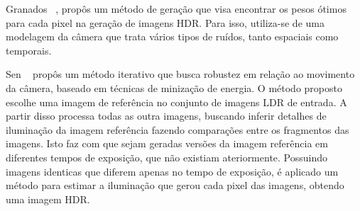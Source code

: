 Granados \etal~\cite{granados}, propôs um método de geração que visa encontrar os pesos ótimos para cada pixel na geração de imagens HDR. Para isso, utiliza-se de uma modelagem da câmera que trata vários tipos de ruídos, tanto espaciais como temporais.


Sen \etal~\cite{hdrMovimento} propôs um método iterativo que busca robustez em relação ao movimento da câmera, baseado em técnicas de minização de energia. O método proposto escolhe uma imagem de referência no conjunto de imagens LDR de entrada. A partir disso processa todas as outra imagens, buscando inferir detalhes de iluminação da imagem referência fazendo comparações entre os fragmentos das imagens. Isto faz com que sejam geradas versões da imagem referência em diferentes tempos de exposição, que não existiam ateriormente. Possuindo imagens identicas que diferem apenas no tempo de exposição, é aplicado um método para estimar a iluminação que gerou cada pixel das imagens, obtendo uma imagem HDR.
